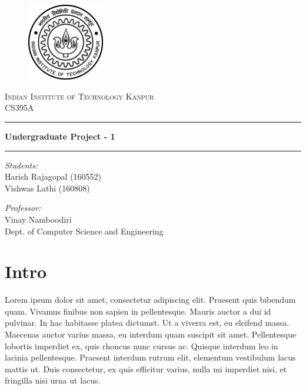 \documentclass[12pt,a4paper,twocolumn]{article}
\begin{document}
    \begin{titlepage}
        \centering

        \vspace*{2cm}
        \begin{figure}[h]
            \centering
            \includegraphics[width=0.3\textwidth]{iitk-logo.png}\\[15mm]
        \end{figure}
        \textsc{\LARGE Indian Institute of Technology Kanpur}\\[1cm]
        {\Large CS395A}\\[7mm]

        \hrule
        \vspace{3mm}
        \textbf{\Large Undergraduate Project - 1}\\[5mm]
        \hrule
        \vspace{3mm}

        \begin{multicols}{2}
            \textit{Students:}\\[2mm]
            Harish Rajagopal (160552)\\
            Vishwas Lathi (160808)\\

            \vfill\null\columnbreak

            \textit{Professor:}\\[2mm]
            Vinay Namboodiri\\
            Dept. of Computer Science and Engineering
        \end{multicols}
    \end{titlepage}


    \section{Intro}
    Lorem ipsum dolor sit amet\cite{srgan}, consectetur adipiscing elit\cite{tensorflow}. Praesent quis bibendum quam. Vivamus finibus non sapien in pellentesque. Mauris auctor a dui id pulvinar. In hac habitasse platea dictumst. Ut a viverra est, eu eleifend massa. Maecenas auctor varius massa, eu interdum quam suscipit sit amet. Pellentesque lobortis imperdiet ex, quis rhoncus nunc cursus ac. Quisque interdum leo in lacinia pellentesque. Praesent interdum rutrum elit, elementum vestibulum lacus mattis ut. Duis consectetur, ex quis efficitur varius, nulla mi imperdiet nisi, et fringilla nisi urna ut lacus.
\end{document}
